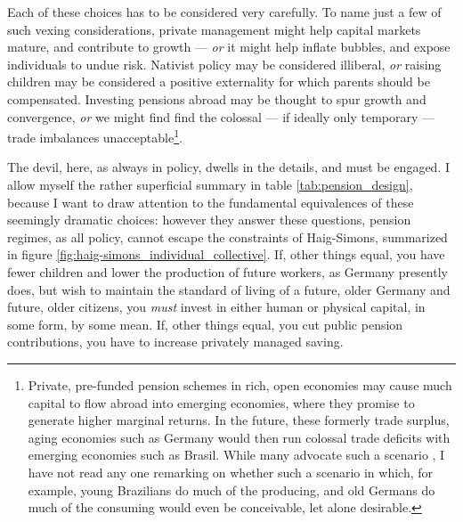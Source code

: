\documentclass[11pt,a4paper,oneside,openright]{article}
\begin{document}

Each of these choices has to be considered very carefully. 
To name just a few of such vexing considerations, private management might help capital markets mature, and contribute to growth \citep[155]{Barr2005a} --- \emph{or} it might help inflate bubbles, and expose individuals to undue risk. 
Nativist policy may be considered illiberal, \emph{or} raising children may be considered a positive externality for which parents should be compensated. 
Investing pensions abroad may be thought to spur growth and convergence, \emph{or} we might find find the colossal --- if ideally only temporary --- trade imbalances unacceptable\footnote{
	Private, pre-funded pension schemes in rich, open economies may cause much capital to flow abroad into emerging economies, where they promise to generate higher marginal returns. 
	In the future, these formerly trade surplus, aging economies such as Germany would then run colossal trade deficits with emerging economies such as Brasil. 
	While many advocate such a scenario \citep[e.g.][176]{Borsch-Supan2003}, I have not read any one remarking on whether such a scenario in which, for example, young Brazilians do much of the producing, and old Germans do much of the consuming would even be conceivable, let alone desirable.
}.

The devil, here, as always in policy, dwells in the details, and must be engaged. 
I allow myself the rather superficial summary in table \ref{tab:pension_design}, because I want to draw attention to the fundamental equivalences of these seemingly dramatic choices: 
however they answer these questions, pension regimes, as all policy, cannot escape the constraints of Haig-Simons, summarized in figure \ref{fig:haig-simons_individual_collective}. 
If, other things equal, you have fewer children and lower the production of future workers, as Germany presently does, but wish to maintain the standard of living of a future, older Germany and future, older citizens, you \emph{must} invest in either human or physical capital, in some form, by some mean. 
If,  other things equal, you cut public pension contributions, you have to increase privately managed saving.
\end{document}
